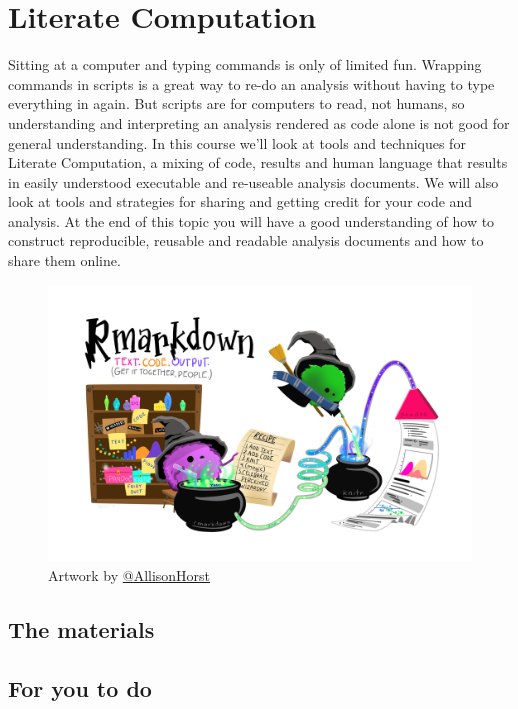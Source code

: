\documentclass[
]{book}
\begin{document}
\hypertarget{literate-computation}{%
\chapter{Literate Computation}\label{literate-computation}}

Sitting at a computer and typing commands is only of limited fun. Wrapping commands in scripts is a great way to re-do an analysis without having to type everything in again. But scripts are for computers to read, not humans, so understanding and interpreting an analysis rendered as code alone is not good for general understanding. In this course we'll look at tools and techniques for Literate Computation, a mixing of code, results and human language that results in easily understood executable and re-useable analysis documents. We will also look at tools and strategies for sharing and getting credit for your code and analysis. At the end of this topic you will have a good understanding of how to construct reproducible, reusable and readable analysis documents and how to share them online.

\begin{figure}
\centering
\includegraphics{rmarkdown_wizards.png}
\caption{\label{fig:unnamed-chunk-7}Artwork by \href{https://github.com/allisonhorst}{@AllisonHorst}}
\end{figure}

\hypertarget{the-materials-6}{%
\section{The materials}\label{the-materials-6}}

\hypertarget{for-you-to-do-6}{%
\section{For you to do}\label{for-you-to-do-6}}
\end{document}
